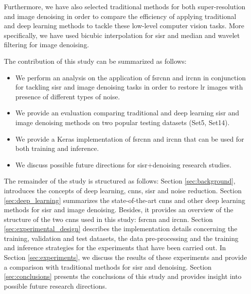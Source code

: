 Furthermore, we have also selected traditional methods for both super-resolution and image denoising in order to compare the efficiency of applying traditional and deep learning methods to tackle these low-level computer vision tasks. More specifically, we have used bicubic interpolation for \gls{sisr} and median and wavelet filtering for image denoising.

The contribution of this study can be summarized as follows:
\begin{itemize}
	\item We perform an analysis on the application of  \gls{fsrcnn} and \gls{ircnn} in conjunction for tackling \gls{sisr} and image denoising tasks in order to restore \gls{lr} images with presence of different types of noise.
	\item We provide an evaluation comparing traditional and deep learning \gls{sisr} and image denoising methods on two popular testing datasets (Set5, Set14).
	\item We provide a Keras \cite{KERAS} implementation of \gls{fsrcnn} and \gls{ircnn} that can be used for both training and inference.
	\item We discuss possible future directions for \gls{sisr}+denoising research studies.
\end{itemize}

The remainder of the study is structured as follows: Section \ref{sec:background}, introduces the concepts of deep learning, \glspl{cnn}, \gls{sisr} and noise reduction. Section \ref{sec:deep_learning} summarizes the state-of-the-art \glspl{cnn} and other deep learning methods for \gls{sisr} and image denoising. Besides, it provides an overview of the structure of the two \glspl{cnn} used in this study: \gls{fsrcnn} and \gls{ircnn}. Section \ref{sec:experimental_design} describes the implementation details concerning the training, validation and test datasets, the data pre-processing and the training and inference strategies for the experiments that have been carried out. In Section \ref{sec:experiments}, we discuss the results of these experiments and provide a comparison with traditional methods for \gls{sisr} and denoising. Section \ref{sec:conclusions} presents the conclusions of this study and provides insight into possible future research directions.